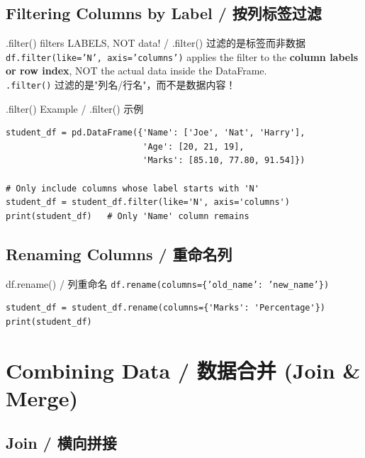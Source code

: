 \documentclass[11pt,a4paper]{report}
\let\oldtexttt\texttt
\renewcommand{\texttt}[1]{\textcolor{mainblue}{\oldtexttt{#1}}}
\begin{document}
\subsection{Filtering Columns by Label / 按列标签过滤}

\begin{warning}{.filter() filters LABELS, NOT data! / .filter() 过滤的是标签而非数据}
    \texttt{df.filter(like='N', axis='columns')} applies the filter to the \textbf{column labels or row index}, NOT the actual data inside the DataFrame. \\
    \texttt{.filter()} 过滤的是"列名/行名"，而不是数据内容！
\end{warning}

\begin{examplebox}{.filter() Example / .filter() 示例}
\begin{lstlisting}
student_df = pd.DataFrame({'Name': ['Joe', 'Nat', 'Harry'],
                           'Age': [20, 21, 19],
                           'Marks': [85.10, 77.80, 91.54]})

# Only include columns whose label starts with 'N'
student_df = student_df.filter(like='N', axis='columns')
print(student_df)   # Only 'Name' column remains
\end{lstlisting}
\end{examplebox}

\subsection{Renaming Columns / 重命名列}

\begin{examplebox}{df.rename() / 列重命名}
    \texttt{df.rename(columns=\{'old\_name': 'new\_name'\})}
\begin{lstlisting}
student_df = student_df.rename(columns={'Marks': 'Percentage'})
print(student_df)
\end{lstlisting}
\end{examplebox}

\section{Combining Data / 数据合并 (Join \& Merge)}

\subsection{Join / 横向拼接}
\end{document}
